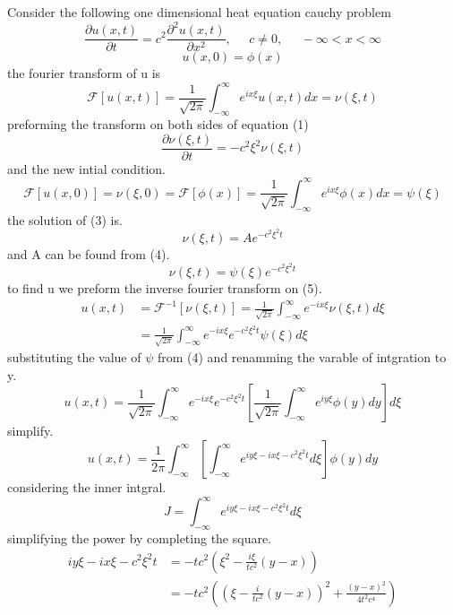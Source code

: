 \documentclass[]{article}
\begin{document}
Consider the following one dimensional heat equation cauchy problem
\begin{equation}
\frac{\partial u(x,t)}{\partial t} = c^2\frac{\partial^2 u(x,t)}{\partial x^2}, \;\;\;\;\; c\neq0, \;\;\;\;\; -\infty < x< \infty
\end{equation}
\begin{equation}
u(x,0) = \phi (x)
\end{equation}
the fourier transform of u is
\[
    \mathscr{F}[u(x,t)] = \frac{1}{\sqrt{2\pi}}\int_{-\infty}^{\infty}e^{ix\xi}u\left(x,t\right)dx= \nu\left(\xi,t\right)    
\]
preforming the transform on both sides of equation (1)
\begin{equation}
\frac{\partial\nu(\xi,t)}{\partial t} = -c^2 \xi^2 \nu(\xi,t)
\end{equation}
and the new intial condition.
\begin{equation}
\mathscr{F}[u(x,0)] = \nu(\xi,0) =\mathscr{F}[\phi(x)] = \frac{1}{\sqrt{2\pi}}\int_{-\infty}^{\infty}e^{ix\xi}\phi\left(x\right)dx = \psi(\xi)
\end{equation}
the solution of (3) is.
\[
    \nu(\xi,t) = Ae^{-c^2 \xi^2 t}    
\]
and A can be found from (4). 
\begin{equation}
\nu(\xi,t)= \psi(\xi)e^{-c^2 \xi^2 t}
\end{equation}
to find u we preform the inverse fourier transform on (5).
\begin{align*}
u(x,t) &= \mathscr{F}^{-1}[\nu(\xi,t)] = \frac{1}{\sqrt{2\pi}}\int_{-\infty}^{\infty}e^{-ix\xi}\nu(\xi,t)d\xi
\\
&= \frac{1}{\sqrt{2\pi}}\int_{-\infty}^{\infty}e^{-ix\xi}e^{-c^2 \xi^2 t}\psi(\xi)d\xi
\end{align*}
substituting the value of $\psi$ from (4) and renamming the varable of intgration to y.
\[
    u(x,t) = \frac{1}{\sqrt{2\pi}}\int_{-\infty}^{\infty}e^{-ix\xi}e^{-c^2 \xi^2 t}\left[\frac{1}{\sqrt{2\pi}}\int_{-\infty}^{\infty}e^{iy\xi}\phi\left(y\right)dy\right]d\xi    
\]
simplify.
\begin{equation}
u(x,t) = \frac{1}{2\pi}\int_{-\infty}^{\infty}\left[\int_{-\infty}^{\infty}e^{iy\xi -ix\xi - c^2 \xi^2 t} d\xi \right] \phi(y)dy
\end{equation}
considering the inner intgral.
\begin{equation}
J = \int_{-\infty}^{\infty}e^{iy\xi -ix\xi - c^2 \xi^2 t} d\xi
\end{equation}
simplifying the power by completing the square.
\begin{align*}
iy\xi -ix\xi - c^2 \xi^2 t &= -tc^2\left(\xi^2-\frac{i\xi}{tc^2}(y-x)\right)
\\
&= -tc^2\left({(\xi-\frac{i}{tc^2}(y-x))}^2 + \frac{{(y-x)}^2}{4t^2 c^4}\right)
\end{align*}
\end{document}
